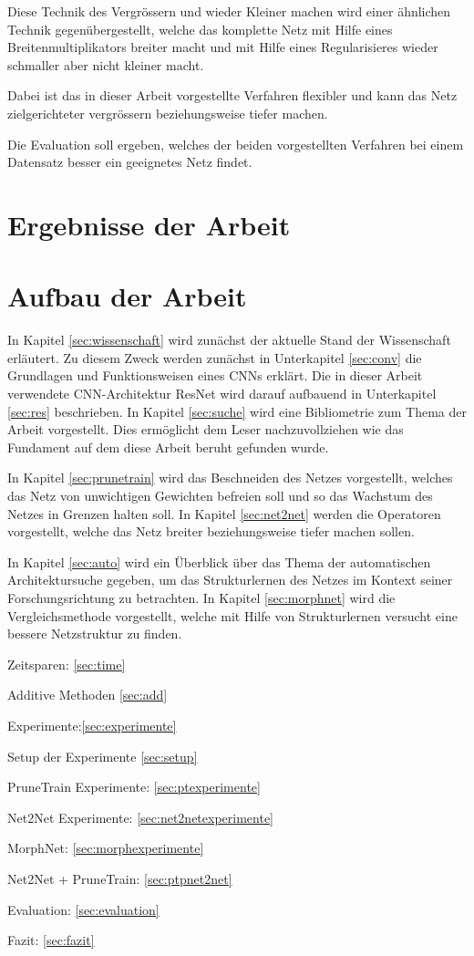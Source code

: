 Diese Technik des Vergrössern und wieder Kleiner machen wird einer ähnlichen Technik gegenübergestellt, welche das komplette Netz mit Hilfe eines Breitenmultiplikators breiter macht und mit Hilfe eines Regularisieres wieder schmaller aber nicht kleiner macht.

Dabei ist das in dieser Arbeit vorgestellte Verfahren flexibler und kann das Netz zielgerichteter vergrössern beziehungsweise tiefer machen.

Die Evaluation soll ergeben, welches der beiden vorgestellten Verfahren bei einem Datensatz besser ein geeignetes Netz findet.


\section{Ergebnisse der Arbeit}


\section{Aufbau der Arbeit}
In Kapitel \ref{sec:wissenschaft} wird zunächst der aktuelle Stand der Wissenschaft erläutert. Zu diesem Zweck werden zunächst in Unterkapitel \ref{sec:conv} die Grundlagen und Funktionsweisen eines CNNs erklärt. Die in dieser Arbeit verwendete CNN-Architektur ResNet wird darauf aufbauend in Unterkapitel \ref{sec:res} beschrieben. In Kapitel \ref{sec:suche} wird eine Bibliometrie zum Thema der Arbeit vorgestellt. Dies ermöglicht dem Leser nachzuvollziehen wie das Fundament auf dem diese Arbeit beruht gefunden wurde. 


In Kapitel \ref{sec:prunetrain} wird das Beschneiden des Netzes vorgestellt, welches das Netz von unwichtigen Gewichten befreien soll und so das Wachstum des Netzes in Grenzen halten soll. In Kapitel \ref{sec:net2net} werden die Operatoren vorgestellt, welche das Netz breiter beziehungsweise tiefer machen sollen.


In Kapitel \ref{sec:auto} wird ein Überblick über das Thema der automatischen Architektursuche gegeben, um das Strukturlernen des Netzes im Kontext seiner Forschungsrichtung zu betrachten. In Kapitel \ref{sec:morphnet} wird die Vergleichsmethode vorgestellt, welche mit Hilfe von Strukturlernen versucht eine bessere Netzstruktur zu finden.


Zeitsparen: \ref{sec:time}

Additive Methoden \ref{sec:add}

Experimente:\ref{sec:experimente}

Setup der Experimente \ref{sec:setup}

PruneTrain Experimente: \ref{sec:ptexperimente}

Net2Net Experimente: \ref{sec:net2netexperimente}

MorphNet: \ref{sec:morphexperimente}

Net2Net + PruneTrain: \ref{sec:ptpnet2net}

Evaluation: \ref{sec:evaluation}

Fazit: \ref{sec:fazit}
\color{black}
